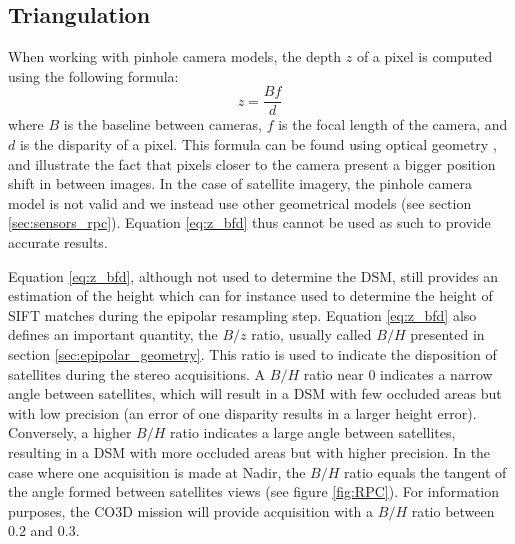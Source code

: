 \subsection{Triangulation}\label{sec:triangulation}
When working with pinhole camera models, the depth $z$ of a pixel is computed using the following formula:
\begin{equation}
	z=\frac{Bf}{d}\label{eq:z_bfd}
\end{equation}
where $B$ is the baseline between cameras, $f$ is the focal length of the camera, and $d$ is the disparity of a pixel. This formula can be found using optical geometry \cite{bolles_epipolar-plane_1987}, and illustrate the fact that pixels closer to the camera present a bigger position shift in between images. In the case of satellite imagery, the pinhole camera model is not valid and we instead use other geometrical models (see section \ref{sec:sensors_rpc}). Equation \eqref{eq:z_bfd} thus cannot be used as such to provide accurate results.
\begin{remark}
	 Equation \eqref{eq:z_bfd}, although not used to determine the DSM, still provides an estimation of the height which can for instance used to determine the height of SIFT matches during the epipolar resampling step. Equation \eqref{eq:z_bfd} also defines an important quantity, the $B/z$ ratio, usually called $B/H$ presented in section \ref{sec:epipolar_geometry}. This ratio is used to indicate the disposition of satellites during the stereo acquisitions. A $B/H$ ratio near $0$ indicates a narrow angle between satellites, which will result in a DSM with few occluded areas but with low precision (an error of one disparity results in a larger height error). Conversely, a higher $B/H$ ratio indicates a large angle between satellites, resulting in a DSM with more occluded areas but with higher precision. In the case where one acquisition is made at Nadir, the $B/H$ ratio equals the tangent of the angle formed between satellites views (see figure \ref{fig:RPC}). For information purposes, the CO3D mission will provide acquisition with a $B/H$ ratio between $0.2$ and $0.3$.
\end{remark}

